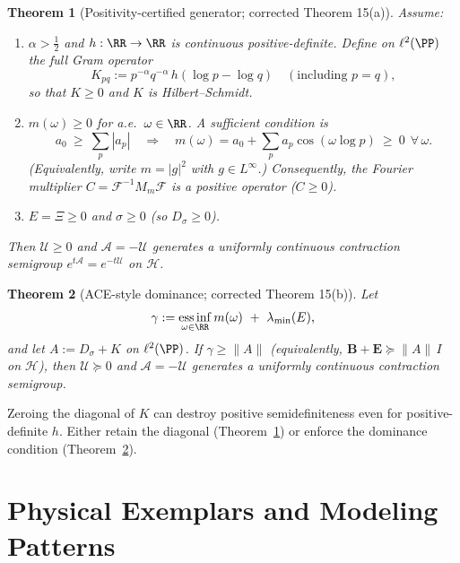 \documentclass[12]{amsart}
\newtheorem{theorem}{Theorem}
\theoremstyle{plain}
\begin{document}
\begin{theorem}[Positivity-certified generator; corrected Theorem 15(a)]\label{thm:15a}
Assume:
\begin{enumerate}
\item $\alpha>\tfrac12$ and $h:\RR\to\RR$ is continuous positive-definite. Define on $\ell^2(\PP)$ the full Gram operator
\[
K_{pq}:=p^{-\alpha}q^{-\alpha}\,h(\log p-\log q)\quad(\text{including }p=q),
\]
so that $K\ge 0$ and $K$ is Hilbert--Schmidt.
\item $m(\omega)\ge 0$ for a.e.\ $\omega\in\RR$. A sufficient condition is
\[
a_0\ \ge\ \sum_{p}|a_p|
\quad\Longrightarrow\quad
m(\omega)=a_0+\sum_{p}a_p\cos(\omega\log p)\ \ge\ 0\ \ \forall\,\omega.
\]
(Equivalently, write $m=|g|^2$ with $g\in L^\infty$.) \emph{Consequently, the Fourier multiplier}
$C=\mathcal F^{-1}M_m\mathcal F$ \emph{is a positive operator} ($C\ge 0$).
\item $E=\Xi\ge 0$ and $\sigma\ge 0$ (so $D_\sigma\ge 0$).
\end{enumerate}
Then $\mathcal U\ge 0$ and $\mathcal A=-\mathcal U$ generates a uniformly continuous contraction semigroup $e^{t\mathcal A}=e^{-t\mathcal U}$ on $\mathcal H$.
\end{theorem}

\begin{theorem}[ACE-style dominance; corrected Theorem 15(b)]\label{thm:15b}
Let
\[
\gamma := \operatorname*{ess\,inf}_{\omega\in\RR} m(\omega)\ +\ \lambda_{\min}(E),
\]
and let $A:=D_\sigma+K$ on $\ell^2(\PP)$. If $\gamma \ge \|A\|$ (equivalently, $\mathbf B+\mathbf E \succeq \|A\|\,I$ on $\mathcal H$),
then $\mathcal U\succeq 0$ and $\mathcal A=-\mathcal U$ generates a uniformly continuous contraction semigroup.
\end{theorem}

\begin{remark}
Zeroing the diagonal of $K$ can destroy positive semidefiniteness even for positive-definite $h$.
Either retain the diagonal (Theorem~\ref{thm:15a}) or enforce the dominance condition (Theorem~\ref{thm:15b}).
\end{remark}
\section{Physical Exemplars and Modeling Patterns}\label{sec:physical-exemplars}
\end{document}
